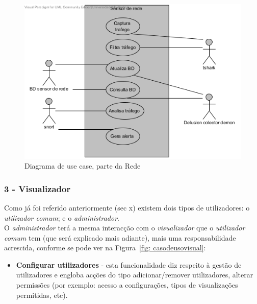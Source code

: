\begin{figure}[!htb]
	\centering
	\includegraphics[scale=0.80]{images/ucs/Rede}
	\caption {Diagrama de use case, parte da Rede}
\end{figure}
\pagebreak

\newcommand{\uticomum}{\emph{utilizador comum}\xspace} 
\newcommand{\admini}{\emph{administrador}\xspace} 
\newcommand{\visualz}{\emph{visualizador}\xspace}
\subsubsection{\textbf{3 - Visualizador}}

Como já foi referido anteriormente (sec x) existem dois tipos de utilizadores: o \uticomum; e o \admini.\\ 

O \admini terá a mesma interacção com o \visualz que o \uticomum tem (que será explicado mais adiante), mais uma responsabilidade acrescida, 
conforme se pode ver na Figura~\ref{fig: casodeusovisual}:

\begin{itemize}
 \item \textbf{Configurar utilizadores} - esta funcionalidade diz respeito à gestão de utilizadores e engloba acções do tipo adicionar/remover utilizadores, 
 alterar permissões (por exemplo: acesso a configurações, tipos de visualizações permitidas, etc).
\end{itemize}

